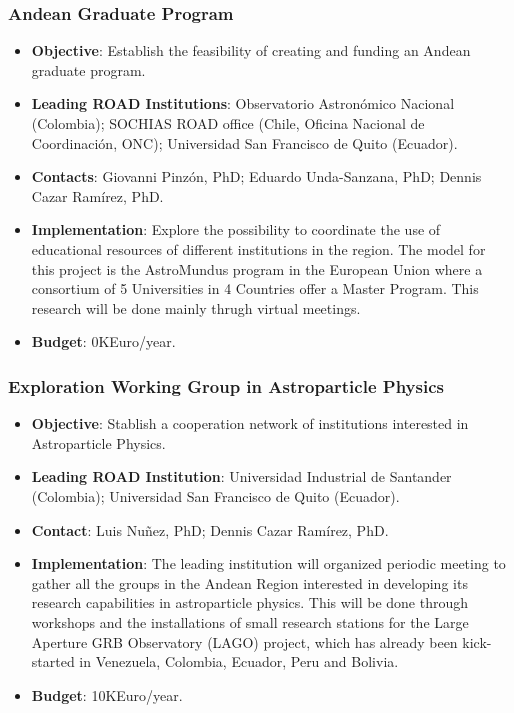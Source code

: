 \documentclass[12pt]{article}
\begin{document}
\subsubsection{Andean Graduate Program}
\begin{itemize}
\item{\bf Objective}: Establish the feasibility of creating and
  funding an Andean graduate program. 
\item{\bf Leading ROAD Institutions}: Observatorio Astron\'omico
  Nacional (Colombia); SOCHIAS ROAD office  (Chile, Oficina
  Nacional de Coordinaci\'on, ONC);  Universidad San
  Francisco de Quito (Ecuador).
\item{\bf Contacts}: Giovanni Pinz\'on, PhD; Eduardo Unda-Sanzana,
  PhD; Dennis Cazar Ram\'irez, PhD. 
\item{\bf Implementation}:
  Explore the possibility to coordinate the use of
  educational resources of different institutions in the region. The
  model for this project is the AstroMundus program in the European
  Union where a consortium of 5 Universities in 4 Countries offer a
  Master Program.  This research will be done mainly thrugh virtual
  meetings.  
\item{\bf Budget}: 0KEuro/year.
\end{itemize}

\subsubsection{Exploration Working Group in Astroparticle Physics}
\begin{itemize}
\item{\bf Objective}: Stablish a cooperation network of institutions
  interested in Astroparticle Physics.
\item{\bf Leading ROAD Institution}: Universidad
  Industrial de Santander (Colombia); Universidad San
  Francisco de Quito (Ecuador). 
\item{\bf Contact}: Luis Nu\~nez, PhD; Dennis Cazar Ram\'irez, PhD. 
\item{\bf Implementation}: The leading institution will organized
  periodic meeting to gather all the groups in the Andean Region
  interested in developing its research capabilities in astroparticle
  physics. This will be done through workshops and the installations
  of small research stations for the Large Aperture GRB Observatory
  (LAGO) project, which has already been kick-started 
  in Venezuela, Colombia, Ecuador, Peru and Bolivia.
\item{\bf Budget}: 10KEuro/year.
\end{itemize}
\end{document}
